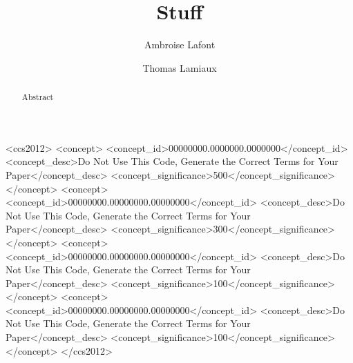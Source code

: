 \documentclass[sigconf,review,anonymous]{acmart}
\begin{document}
\title{Stuff}

\author{Ambroise Lafont}
\author{Thomas Lamiaux}



\begin{abstract}
  Abstract
\end{abstract}

\begin{CCSXML}
<ccs2012>
 <concept>
  <concept_id>00000000.0000000.0000000</concept_id>
  <concept_desc>Do Not Use This Code, Generate the Correct Terms for Your Paper</concept_desc>
  <concept_significance>500</concept_significance>
 </concept>
 <concept>
  <concept_id>00000000.00000000.00000000</concept_id>
  <concept_desc>Do Not Use This Code, Generate the Correct Terms for Your Paper</concept_desc>
  <concept_significance>300</concept_significance>
 </concept>
 <concept>
  <concept_id>00000000.00000000.00000000</concept_id>
  <concept_desc>Do Not Use This Code, Generate the Correct Terms for Your Paper</concept_desc>
  <concept_significance>100</concept_significance>
 </concept>
 <concept>
  <concept_id>00000000.00000000.00000000</concept_id>
  <concept_desc>Do Not Use This Code, Generate the Correct Terms for Your Paper</concept_desc>
  <concept_significance>100</concept_significance>
 </concept>
</ccs2012>
\end{CCSXML}
\end{document}
